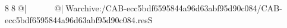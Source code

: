 8  8  @|                                                  @| W   archive:/CAB-ecc5bdf6595844a96d63abf95d90c084/CAB-ecc5bdf6595844a96d63abf95d90c084.resS 